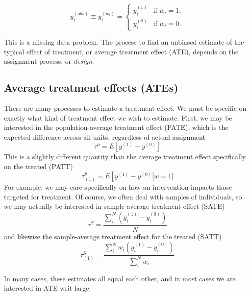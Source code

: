 \begin{equation}
y_i^{\left(obs\right)} \equiv y_i^{\left(w_i\right)} = \left\{ \begin{array}{ll}
     y_i^{\left(1\right)} & \mbox{if $w_i=1$};\\
     y_i^{\left(0\right)} & \mbox{if $w_i=0$}.\end{array} \right.
\end{equation}

This is a missing data problem. The process to find an unbiased estimate of the typical effect of treatment, or average treatment effect (ATE), depends on the assignment process, or {\it design}.

\subsection{Average treatment effects (ATEs)}

There are many processes to estimate a treatment effect. We must be specific on exactly what kind of treatment effect we wish to estimate. First, we may be interested in the population-average treatment effect (PATE), which is the expected difference across all units, regardless of actual assignment
\begin{equation}
\tau^p = E\left[y^{\left(1\right)}-y^{\left(0\right)}\right]
\end{equation}
This is a slightly different quantity than the average treatment effect specifically on the treated (PATT)
\begin{equation}
\tau_{\left(1\right)}^p = E\left[y^{\left(1\right)}-y^{\left(0\right)}\right\vert w = 1 ]
\end{equation}
For example, we may care specifically on how an intervention impacts those targeted for treatment. Of course, we often deal with samples of individuals, so we may actually be interested in sample-average treatment effect (SATE)
\begin{equation}
\tau^S = \frac{\sum_i^N\left(y_i^{\left(1\right)}-y_i^{\left(0\right)}\right)}{N}
\end{equation}
and likewise the sample-average treatment effect for the treated (SATT)
\begin{equation}
\tau_{\left(1\right)}^S = \frac{\sum_i^Nw_i\left(y_i^{\left(1\right)}-y_i^{\left(0\right)}\right)}{\sum_i^Nw_i}
\end{equation}

In many cases, these estimates all equal each other, and in most cases we are interested in ATE writ large.

